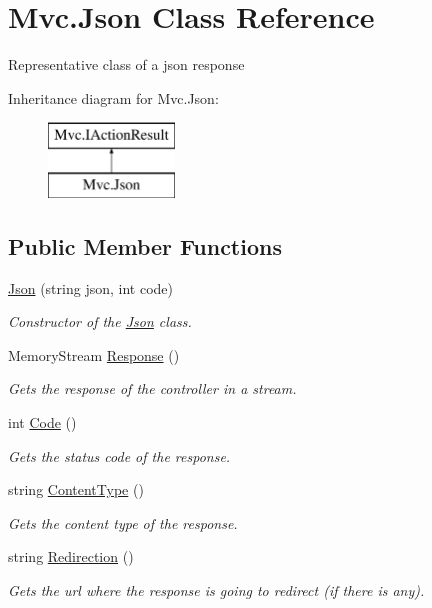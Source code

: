 \hypertarget{class_mvc_1_1_json}{}\section{Mvc.\+Json Class Reference}
\label{class_mvc_1_1_json}


Representative class of a json response  


Inheritance diagram for Mvc.\+Json\+:\begin{figure}[H]
\begin{center}
\leavevmode
\includegraphics[height=2.000000cm]{class_mvc_1_1_json}
\end{center}
\end{figure}
\subsection*{Public Member Functions}
\begin{DoxyCompactItemize}
\item 
\hyperlink{class_mvc_1_1_json_a0b86fdb1b35bca88ae21f0f2282a710d}{Json} (string json, int code)
\begin{DoxyCompactList}\small\item\em Constructor of the \hyperlink{class_mvc_1_1_json}{Json} class. \end{DoxyCompactList}\item 
Memory\+Stream \hyperlink{class_mvc_1_1_json_ae94043bfe0049a44c8b0c61a13b61ac9}{Response} ()
\begin{DoxyCompactList}\small\item\em Gets the response of the controller in a stream. \end{DoxyCompactList}\item 
int \hyperlink{class_mvc_1_1_json_aab9ce2b098ce0b4bfe8ad835a33e71d5}{Code} ()
\begin{DoxyCompactList}\small\item\em Gets the status code of the response. \end{DoxyCompactList}\item 
string \hyperlink{class_mvc_1_1_json_aa2572df4640e171276244cbb14070284}{Content\+Type} ()
\begin{DoxyCompactList}\small\item\em Gets the content type of the response. \end{DoxyCompactList}\item 
string \hyperlink{class_mvc_1_1_json_af8cd874b2a4c9692f0200bde97d40c87}{Redirection} ()
\begin{DoxyCompactList}\small\item\em Gets the url where the response is going to redirect (if there is any). \end{DoxyCompactList}\end{DoxyCompactItemize}
